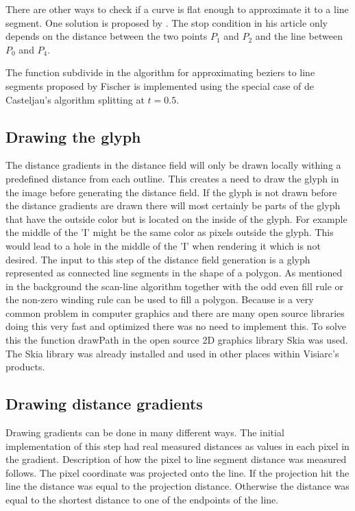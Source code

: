 There are other ways to check if a curve is flat enough to approximate it to a line segment. One solution is proposed by \citet{bezier_subdivision}. The stop condition in his article only depends on the distance between the two points $P_1$ and $P_2$ and the line between $P_0$ and $P_4$.

The function subdivide in the algorithm for approximating beziers to line segments proposed by Fischer is implemented using the special case of de Casteljau's algorithm splitting at $t=0.5$.  
\subsection{Drawing the glyph}
The distance gradients in the distance field will only be drawn locally withing a predefined distance from each outline. This creates a need to draw the glyph in the image before generating the distance field. If the glyph is not drawn before the distance gradients are drawn there will most certainly be parts of the glyph that have the outside color but is located on the inside of the glyph. For example the middle of the 'I' might be the same color as pixels outside the glyph. This would lead to a hole in the middle of the 'I' when rendering it which is not desired. The input to this step of the distance field generation is a glyph represented as connected line segments in the shape of a polygon. As mentioned in the background the scan-line algorithm together with the odd even fill rule or the non-zero winding rule can be used to fill a polygon. Because is a very common problem in computer graphics and there are many open source libraries doing this very fast and optimized there was no need to implement this. To solve this the function drawPath in the open source 2D graphics library Skia was used. The Skia library was already installed and used in other places within Visiarc's products.
\subsection{Drawing distance gradients}
Drawing gradients can be done in many different ways. The initial implementation of this step had real measured distances as values in each pixel in the gradient. Description of how the pixel to line segment distance was measured follows. The pixel coordinate was projected onto the line. If the projection hit the line the distance was equal to the projection distance. Otherwise the distance was equal to the shortest distance to one of the endpoints of the line.

